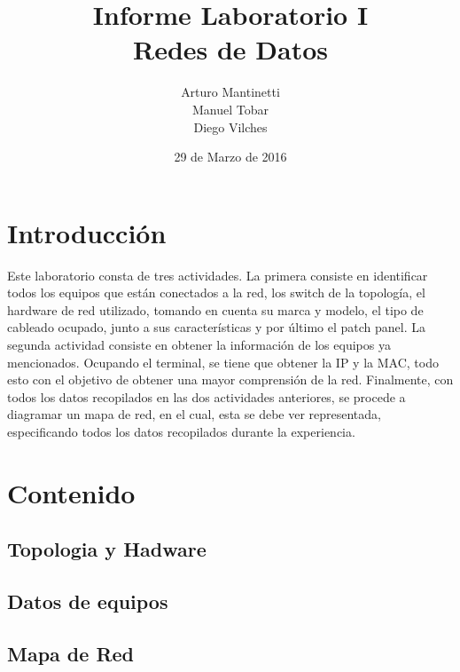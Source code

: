 \documentclass[spanish]{udpreport}
\title{Informe Laboratorio I \\ Redes de Datos}
\author{Arturo Mantinetti \\ Manuel Tobar \\ Diego Vilches}
\date{29 de Marzo de 2016}
\begin{document}
\maketitle

\tableofcontents

\chapter{Introducción}

Este laboratorio consta de tres actividades. La primera consiste en identificar todos los equipos que están conectados a la red, los switch de la topología, el hardware de red utilizado, tomando en cuenta su marca y modelo, el tipo de cableado ocupado, junto a sus características y por último el patch panel. La segunda actividad consiste en obtener la información de los equipos ya mencionados. Ocupando el terminal, se tiene que obtener la IP y la MAC, todo esto con el objetivo de obtener una mayor comprensión de la red. Finalmente, con todos los datos recopilados en las dos actividades anteriores, se procede a diagramar un mapa de red, en el cual, esta se debe ver representada,  especificando todos los datos recopilados durante la experiencia.


\chapter{Contenido}

\section{Topologia y Hadware}

\section{Datos de equipos}

\section{Mapa de Red}

\listoffigures
\end{document}
